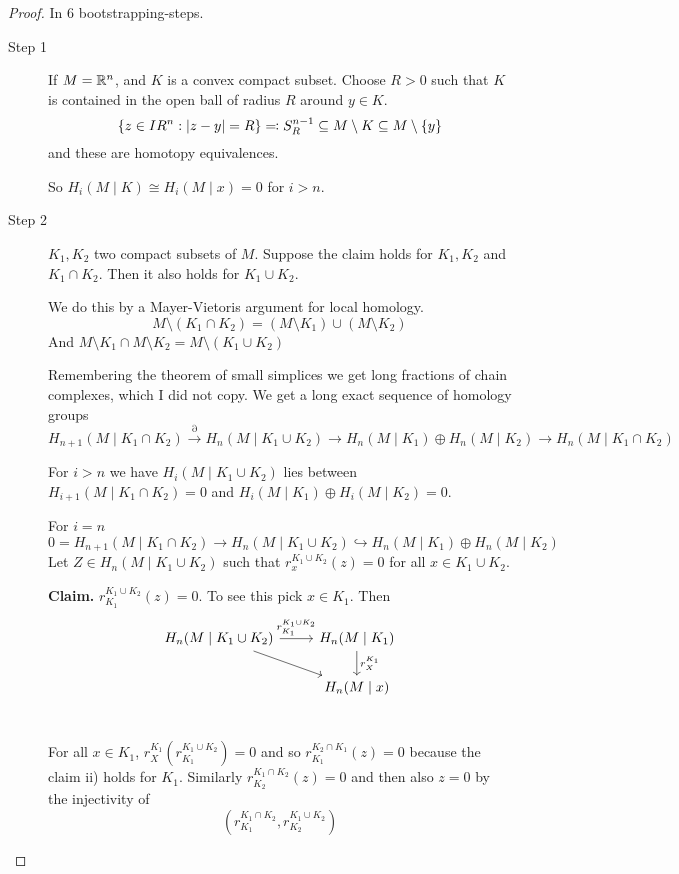 \documentclass[language=english]{TemplateLecture}
\begin{document}
\begin{proof}
    In \(6\) bootstrapping-steps.
    \begin{description}
        \item[Step 1] If \(M = \mathbb{R}^n\), and \(K \) is a convex compact subset. Choose \(R > 0\) such that \(K\) is contained in the open ball of radius \(R\) around \(y \in K\).
        \[\{z \in IR^n : \lvert z-y\rvert = R\} \eqcolon S^{n-1}_R \subseteq  M\setminus K \subseteq M \setminus \{y\}\]
        and these are homotopy equivalences.

        So \(H_i(M \mid K) \cong H_i(M \mid x) = 0\) for \(i > n\).

        \item[Step 2] \(K_1, K_2\) two compact subsets of \(M\). Suppose the claim holds for \(K_1, K_2\) and \(K_1 \cap K_2\). Then it also holds for \(K_1 \cup K_2\).
        
        We do this by a Mayer-Vietoris argument for local homology.
        \[M\setminus(K_1 \cap K_2) = (M\setminus K_1) \cup (M\setminus K_2)\]
        And \(M\setminus K_1 \cap M\setminus K_2 = M \setminus (K_1 \cup K_2)\)

        Remembering the theorem of small simplices we get long fractions of chain complexes, which I did not copy. We get a long exact sequence of homology groups
        \[H_{n+1}(M \mid K_1 \cap K_2) \xrightarrow{\partial} H_{n}(M\mid K_1 \cup K_2) \to H_n(M \mid K_1) \oplus H_n(M \mid K_2) \to H_n(M \mid K_1 \cap K_2)\]

        For \(i > n\) we have \(H_i(M \mid K_1 \cup K_2)\) lies between \(H_{i+1}(M \mid K_1 \cap K_2) = 0\) and \(H_i(M \mid K_1) \oplus H_i(M \mid K_2) = 0\).

        For \(i = n\)
        \[0 = H_{n+1}(M\mid K_1 \cap K_2) \to H_n(M \mid K_1 \cup K_2) \hookrightarrow H_n(M \mid K_1) \oplus H_n(M \mid K_2)\]
        Let \(Z \in H_n(M \mid K_1 \cup K_2)\) such that \(r_x^{K_1 \cup K_2}(z) = 0\) for all \(x \in K_1 \cup K_2\).

        \textbf{Claim.} \(r_{K_1}^{K_1 \cup K_2}(z) = 0\). To see this pick \(x \in K_1\). Then
        \[\begin{tikzcd}
            H_n(M \mid K_1 \cup K_2) \ar[r, "r_{K_1}^{K_1 \cup K_2}"] \ar[dr] & H_n(M \mid K_1) \ar[d, "r_X^{K_1}"] \\
            & H_n(M \mid x) \\
        \end{tikzcd}\]

        For all \(x \in K_1\), \(r_X^{K_1}(r_{K_1}^{K_1 \cup K_2}) = 0\) and so \(r_{K_1}^{K_2 \cap K_1} (z) = 0\) because the claim ii) holds for \(K_1\). Similarly \(r_{K_2}^{K_1 \cap K_2}(z) = 0\) and then also \(z = 0\) by the injectivity of
        \[(r_{K_1}^{K_1 \cap K_2}, r_{K_2}^{K_1 \cup K_2})\]


\end{description}
\end{proof}
\end{document}
